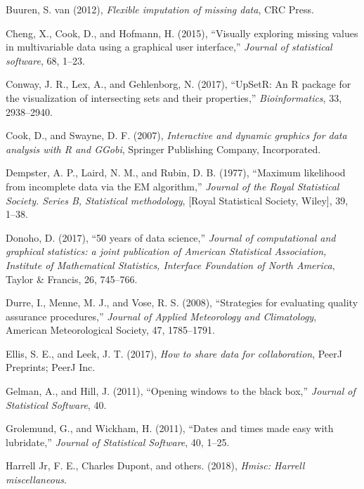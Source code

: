 \documentclass[]{article}
\theoremstyle{definition}
\theoremstyle{definition}
\theoremstyle{definition}
\theoremstyle{remark}
\begin{document}
\leavevmode\hypertarget{ref-VanBuuren2012}{}%
Buuren, S. van (2012), \emph{Flexible imputation of missing data}, CRC
Press.

\leavevmode\hypertarget{ref-Cheng2015}{}%
Cheng, X., Cook, D., and Hofmann, H. (2015), ``Visually exploring
missing values in multivariable data using a graphical user interface,''
\emph{Journal of statistical software}, 68, 1--23.

\leavevmode\hypertarget{ref-Conway2017}{}%
Conway, J. R., Lex, A., and Gehlenborg, N. (2017), ``UpSetR: An R
package for the visualization of intersecting sets and their
properties,'' \emph{Bioinformatics}, 33, 2938--2940.

\leavevmode\hypertarget{ref-Cook2007}{}%
Cook, D., and Swayne, D. F. (2007), \emph{Interactive and dynamic
graphics for data analysis with R and GGobi}, Springer Publishing
Company, Incorporated.

\leavevmode\hypertarget{ref-Dempster1977}{}%
Dempster, A. P., Laird, N. M., and Rubin, D. B. (1977), ``Maximum
likelihood from incomplete data via the EM algorithm,'' \emph{Journal of
the Royal Statistical Society. Series B, Statistical methodology},
{[}Royal Statistical Society, Wiley{]}, 39, 1--38.

\leavevmode\hypertarget{ref-Donoho2017}{}%
Donoho, D. (2017), ``50 years of data science,'' \emph{Journal of
computational and graphical statistics: a joint publication of American
Statistical Association, Institute of Mathematical Statistics, Interface
Foundation of North America}, Taylor \& Francis, 26, 745--766.

\leavevmode\hypertarget{ref-Durre2008-ghcn}{}%
Durre, I., Menne, M. J., and Vose, R. S. (2008), ``Strategies for
evaluating quality assurance procedures,'' \emph{Journal of Applied
Meteorology and Climatology}, American Meteorological Society, 47,
1785--1791.

\leavevmode\hypertarget{ref-Ellis2017}{}%
Ellis, S. E., and Leek, J. T. (2017), \emph{How to share data for
collaboration}, PeerJ Preprints; PeerJ Inc.

\leavevmode\hypertarget{ref-mi}{}%
Gelman, A., and Hill, J. (2011), ``Opening windows to the black box,''
\emph{Journal of Statistical Software}, 40.

\leavevmode\hypertarget{ref-lubridate}{}%
Grolemund, G., and Wickham, H. (2011), ``Dates and times made easy with
lubridate,'' \emph{Journal of Statistical Software}, 40, 1--25.

\leavevmode\hypertarget{ref-Hmisc}{}%
Harrell Jr, F. E., Charles Dupont, and others. (2018), \emph{Hmisc:
Harrell miscellaneous}.
\end{document}
